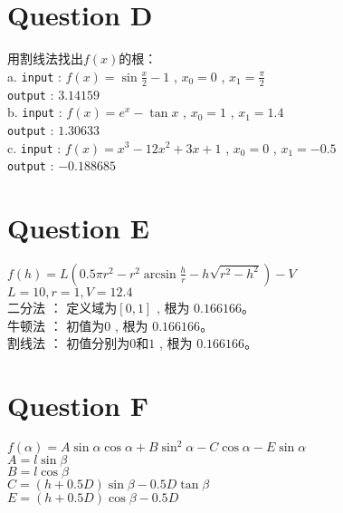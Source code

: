 \documentclass{ctexart}
\begin{document}
\section*{Question D}
\begin{flushleft}
  用割线法找出$f(x)$的根：\\
  a. \verb|input| : $f(x) = \sin {\frac{x}{2}} -1$ , $x_0 = 0$ , $x_1 = \frac{\pi}{2}$\\
  \quad \verb|output| : $3.14159$ \\
 
  b.  \verb|input| : $f(x) = e^x - \tan x$ , $x_0 = 1$ , $x_1 = 1.4$\\
  \quad \verb|output| : $1.30633$ \\
  
  c.  \verb|input| : $f(x) = x^3 - 12x^2 + 3x + 1$ , $x_0 = 0$ , $x_1 = -0.5$\\
  \quad \verb|output| : $-0.188685$ \\
\end{flushleft}

\section*{Question E}
\begin{flushleft}
  $f(h) = L (0.5\pi r^2 - r^2\arcsin \frac{h}{r} - h\sqrt{r^2 - h^2}) - V$ \\
  $L=10 , r=1 , V=12.4$ \\
  二分法 ： 定义域为$[0,1]$ , 根为 $0.166166$。 \\
  牛顿法 ： 初值为$0$ , 根为 $0.166166$。\\
  割线法 ： 初值分别为$0$和$1$ , 根为 $0.166166$。\\
\end{flushleft}

\clearpage
\section*{Question F}
\begin{flushleft}
  $f(\alpha) = A\sin\alpha \cos\alpha + B\sin^2\alpha - C\cos\alpha - E\sin\alpha$ \\
  $A = l \sin\beta$ \\
  $B = l \cos\beta$ \\
  $C = (h + 0.5D)\sin\beta - 0.5D\tan\beta$ \\ 
  $E = (h + 0.5D)\cos\beta - 0.5D$ \\
\end{flushleft}
\end{document}
